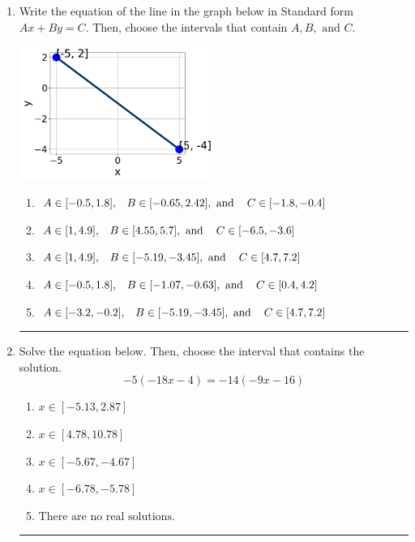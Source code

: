 \documentclass[14pt]{extbook}
\newcommand{\litem}[1]{\item#1\hspace*{-1cm}\rule{\textwidth}{0.4pt}}
\begin{document}
\begin{enumerate}
\litem{
Write the equation of the line in the graph below in Standard form $Ax+By=C$. Then, choose the intervals that contain $A, B, \text{ and } C$.
\begin{center}
    \includegraphics[width=0.5\textwidth]{../Figures/linearGraphToStandardCopyB.png}
\end{center}
\begin{enumerate}[label=\Alph*.]
\item \( A \in [-0.5, 1.8], \hspace{3mm} B \in [-0.65, 2.42], \text{ and } \hspace{3mm} C \in [-1.8, -0.4] \)
\item \( A \in [1, 4.9], \hspace{3mm} B \in [4.55, 5.7], \text{ and } \hspace{3mm} C \in [-6.5, -3.6] \)
\item \( A \in [1, 4.9], \hspace{3mm} B \in [-5.19, -3.45], \text{ and } \hspace{3mm} C \in [4.7, 7.2] \)
\item \( A \in [-0.5, 1.8], \hspace{3mm} B \in [-1.07, -0.63], \text{ and } \hspace{3mm} C \in [0.4, 4.2] \)
\item \( A \in [-3.2, -0.2], \hspace{3mm} B \in [-5.19, -3.45], \text{ and } \hspace{3mm} C \in [4.7, 7.2] \)

\end{enumerate} }
\litem{
Solve the equation below. Then, choose the interval that contains the solution.\[ -5(-18x -4) = -14(-9x -16) \]\begin{enumerate}[label=\Alph*.]
\item \( x \in [-5.13, 2.87] \)
\item \( x \in [4.78, 10.78] \)
\item \( x \in [-5.67, -4.67] \)
\item \( x \in [-6.78, -5.78] \)
\item \( \text{There are no real solutions.} \)


\end{enumerate}}
\end{enumerate}
\end{document}
